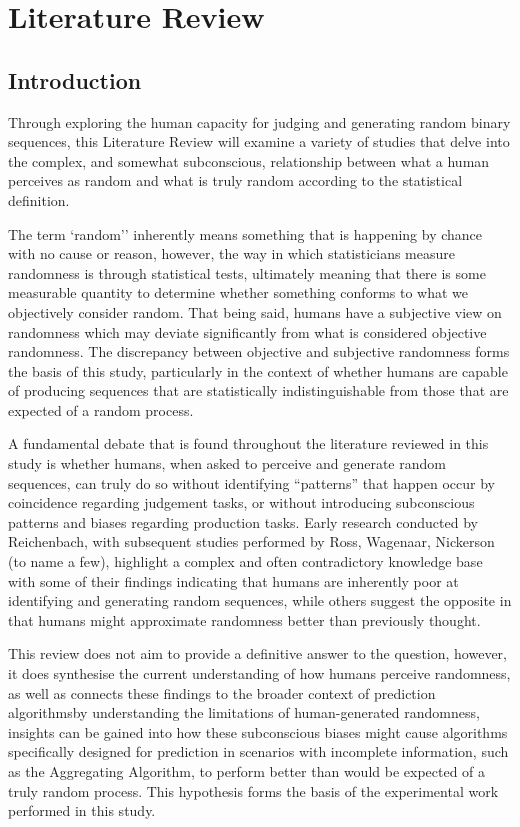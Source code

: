 \section{Literature Review}\label{section:literature_review}
\subsection{Introduction}
Through exploring the human capacity for judging and generating random binary sequences, this Literature Review will examine a variety of studies that delve into the complex, and somewhat subconscious, relationship between what a human perceives as random and what is truly random according to the statistical definition.

The term `random'' inherently means something that is happening by chance with no cause or reason, however, the way in which statisticians measure randomness is through statistical tests, ultimately meaning that there is some measurable quantity to determine whether something conforms to what we objectively consider random. That being said, humans have a subjective view on randomness which may deviate significantly from what is considered objective randomness. The discrepancy between objective and subjective randomness forms the basis of this study, particularly in the context of whether humans are capable of producing sequences that are statistically indistinguishable from those that are expected of a random process.

A fundamental debate that is found throughout the literature reviewed in this study is whether humans, when asked to perceive and generate random sequences, can truly do so without identifying ``patterns'' that happen occur by coincidence regarding judgement tasks, or without introducing subconscious patterns and biases regarding production tasks. Early research conducted by Reichenbach, with subsequent studies performed by Ross, Wagenaar, Nickerson (to name a few), highlight a complex and often contradictory knowledge base with some of their findings indicating that humans are inherently poor at identifying and generating random sequences, while others suggest the opposite in that humans might approximate randomness better than previously thought.

This review does not aim to provide a definitive answer to the question, however, it does synthesise the current understanding of how humans perceive randomness, as well as connects these findings to the broader context of prediction algorithms\textemdash{}by understanding the limitations of human-generated randomness, insights can be gained into how these subconscious biases might cause algorithms specifically designed for prediction in scenarios with incomplete information, such as the Aggregating Algorithm, to perform better than would be expected of a truly random process. This hypothesis forms the basis of the experimental work performed in this study.

